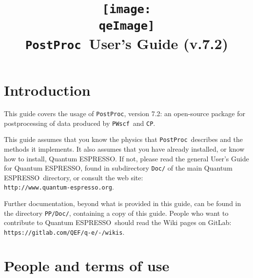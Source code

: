 \documentclass[12pt,a4paper]{article}
\def\version{7.2}
\def\qe{{\sc Quantum ESPRESSO}}
\def\PWscf{\texttt{PWscf}}
\def\CP{\texttt{CP}}
\def\PostProc{\texttt{PostProc}}
\begin{document}
 
\author{}
\date{}

\def\qeImage{../../Doc/quantum_espresso}

\title{
  \texttt{[image: \\qeImage]} \\
  \Huge \PostProc\ User's Guide (v.\version) 
}

\maketitle

\tableofcontents

\section{Introduction}

This guide covers the usage of \PostProc, version \version: 
an open-source package for postprocessing of data produced by
\PWscf\ and \CP.

This guide assumes that you know the physics 
that \PostProc\ describes and the methods it implements.
It also assumes  that you have already installed,
or know how to install, \qe. If not, please read
the general User's Guide for \qe, found in 
subdirectory \texttt{Doc/} of the main \qe\ directory,
or consult the web site:\\
\texttt{http://www.quantum-espresso.org}.

Further documentation, beyond what is provided 
in this guide, can be found in the directory
\texttt{PP/Doc/}, containing a copy of this guide.
People who want to contribute to \qe\ should read the
Wiki pages on GitLab: \texttt{https://gitlab.com/QEF/q-e/-/wikis}.

\section{People and terms of use}
\end{document}
